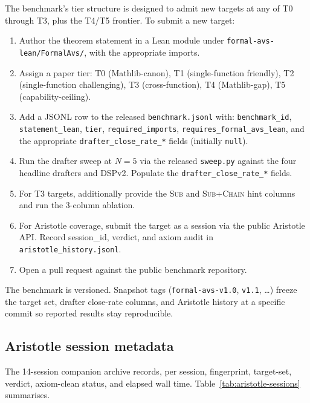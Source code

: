 The benchmark's tier structure is designed to admit new targets
at any of T0 through T3, plus the T4/T5 frontier. To submit a
new target:

\begin{enumerate}[leftmargin=1.3em, itemsep=0.15em]
\item Author the theorem statement in a Lean module under
\texttt{formal-avs-lean/FormalAvs/}, with the appropriate
imports.
\item Assign a paper tier: T0 (Mathlib-canon), T1
(single-function friendly), T2 (single-function challenging), T3
(cross-function), T4 (Mathlib-gap), T5 (capability-ceiling).
\item Add a JSONL row to the released \texttt{benchmark.jsonl}
with: \texttt{benchmark\_id}, \texttt{statement\_lean},
\texttt{tier}, \texttt{required\_imports},
\texttt{requires\_formal\_avs\_lean}, and the appropriate
\texttt{drafter\_close\_rate\_*} fields (initially \texttt{null}).
\item Run the drafter sweep at $N=5$ via the released
\texttt{sweep.py} against the four headline drafters and DSPv2.
Populate the \texttt{drafter\_close\_rate\_*} fields.
\item For T3 targets, additionally provide the \textsc{Sub} and
\textsc{Sub+Chain} hint columns and run the 3-column ablation.
\item For Aristotle coverage, submit the target as a session
via the public Aristotle API. Record session\_id, verdict, and
axiom audit in \texttt{aristotle\_history.jsonl}.
\item Open a pull request against the public benchmark
repository.
\end{enumerate}

The benchmark is versioned. Snapshot tags
(\texttt{formal-avs-v1.0}, \texttt{v1.1}, \ldots) freeze the
target set, drafter close-rate columns, and Aristotle history at a
specific commit so reported results stay reproducible.

\subsection{Aristotle session metadata}
\label{app:aristotle-session-metadata}

The 14-session companion archive records, per session,
fingerprint, target-set, verdict, axiom-clean status, and
elapsed wall time. Table~\ref{tab:aristotle-sessions} summarises.

